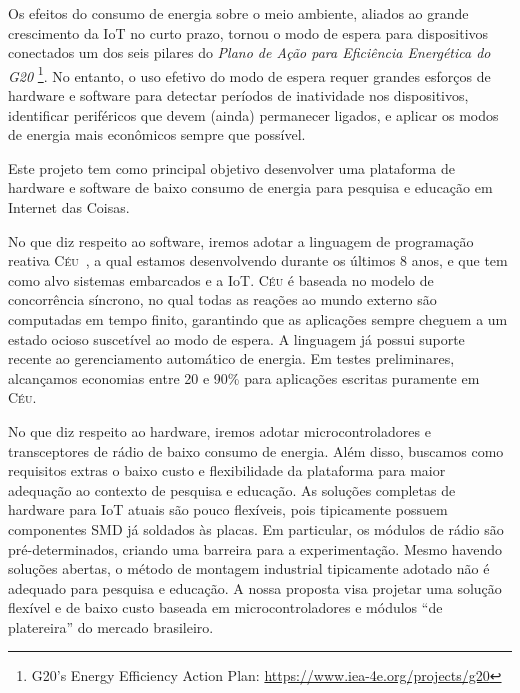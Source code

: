 \documentclass[titlepage,12pt]{article}
\newcommand{\CEU}{\textsc{C\'{e}u}\xspace}
\begin{document}
Os efeitos do consumo de energia sobre o meio ambiente, aliados ao grande
crescimento da IoT no curto prazo, tornou o modo de espera para dispositivos
conectados um dos seis pilares do \emph{Plano de Ação para Eficiência
Energética do G20}%
\footnote{G20's Energy Efficiency Action Plan: \url{https://www.iea-4e.org/projects/g20}}.
No entanto, o uso efetivo do modo de espera requer grandes esforços de hardware
e software para detectar períodos de inatividade nos dispositivos, identificar
periféricos que devem (ainda) permanecer ligados, e aplicar os modos de energia
mais econômicos sempre que possível.

Este projeto tem como principal objetivo desenvolver uma plataforma de hardware
e software de baixo consumo de energia para pesquisa e educação em Internet das
Coisas.

No que diz respeito ao software, iremos adotar a linguagem de programação
reativa \CEU~\cite{ceu.sensys13}, a qual estamos desenvolvendo durante os
últimos 8 anos, e que tem como alvo sistemas embarcados e a IoT.
%
\CEU é baseada no modelo de concorrência síncrono, no qual todas as reações ao
mundo externo são computadas em tempo finito, garantindo que as aplicações
sempre cheguem a um estado ocioso suscetível ao modo de espera.
%
A linguagem já possui suporte recente ao gerenciamento automático de energia.
Em testes preliminares, alcançamos economias entre 20 e 90\% para aplicações
escritas puramente em \CEU.

No que diz respeito ao hardware, iremos adotar microcontroladores e
transceptores de rádio de baixo consumo de energia.
Além disso, buscamos como requisitos extras o baixo custo e flexibilidade da
plataforma para maior adequação ao contexto de pesquisa e educação.
%
As soluções completas de hardware para IoT atuais são pouco flexíveis, pois
tipicamente possuem componentes SMD já soldados às placas.
Em particular, os módulos de rádio são pré-determinados, criando uma barreira
para a experimentação.
Mesmo havendo soluções abertas, o método de montagem industrial tipicamente
adotado não é adequado para pesquisa e educação.
%
A nossa proposta visa projetar uma solução flexível e de baixo custo baseada em
microcontroladores e módulos ``de platereira'' do mercado brasileiro.

\end{document}
